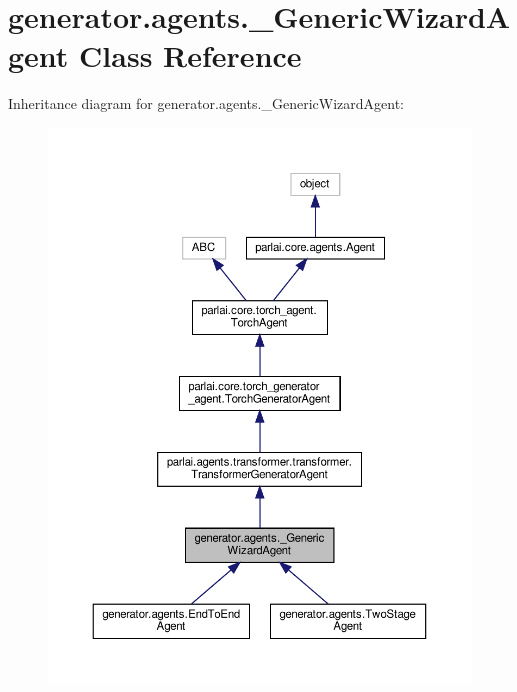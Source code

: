 \hypertarget{classgenerator_1_1agents_1_1__GenericWizardAgent}{}\section{generator.\+agents.\+\_\+\+Generic\+Wizard\+Agent Class Reference}
\label{classgenerator_1_1agents_1_1__GenericWizardAgent}


Inheritance diagram for generator.\+agents.\+\_\+\+Generic\+Wizard\+Agent\+:
\nopagebreak
\begin{figure}[H]
\begin{center}
\leavevmode
\includegraphics[width=350pt]{classgenerator_1_1agents_1_1__GenericWizardAgent__inherit__graph}
\end{center}
\end{figure}


